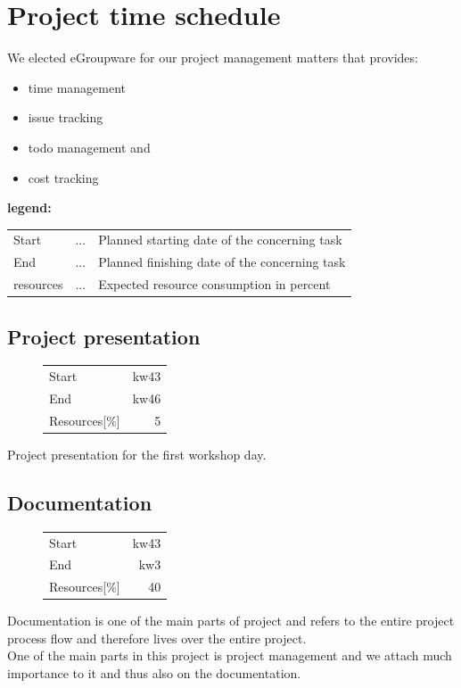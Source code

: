 \section{Project time schedule}

We elected eGroupware for our project management matters that provides:
\begin{itemize}
 \item time management
 \item issue tracking
 \item todo management and
 \item cost tracking
\end{itemize}

\textbf{legend:} \\
\begin{tabular}{lcl}
Start & ... & Planned starting date of the concerning task\\
End   & ... & Planned finishing date of the concerning task\\ 
resources & ... & Expected resource consumption in percent\\
\end{tabular}


\subsection{Project presentation}
\begin{figure}
\begin{tabular}[t]{|lr|}
\hline
Start & kw43\\
End & kw46\\
Resources[\%] & 5\\
\hline
\end{tabular}
\end{figure}
Project presentation for the first workshop day.\\

\subsection{Documentation}
\begin{figure}
\begin{tabular}[t]{|lr|}
\hline
Start & kw43\\
End & kw3\\
Resources[\%] & 40\\
\hline
\end{tabular}
\end{figure}
Documentation is one of the main parts of project and refers to the entire project 
process flow and therefore lives over the entire project.\\
One of the main parts in this project is project management and we attach much 
importance to it and thus also on the documentation.\\

